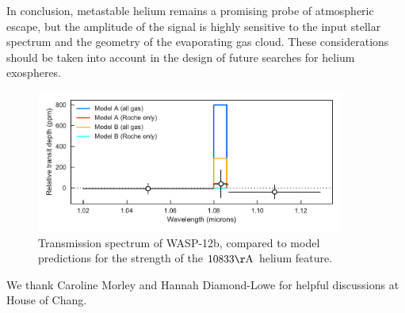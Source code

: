 \documentclass[RNAAS]{aastex62}
\begin{document}
In conclusion, metastable helium remains a promising probe of atmospheric
escape, but the amplitude of the signal is highly sensitive to the input stellar
spectrum and the geometry of
the evaporating gas cloud.  These considerations should be taken into account in the design of future searches for helium exospheres.

 
\begin{figure}
\begin{centering}
\includegraphics[width = 0.9\textwidth]{fig1.pdf}
\caption{Transmission spectrum of WASP-12b, compared to model predictions for
the strength of the $10833\mathrm{\AA}$ helium feature.}
\end{centering}
\label{fig:spectrum}
\end{figure}

\acknowledgements
We thank Caroline Morley and Hannah Diamond-Lowe for helpful discussions at House of Chang.

%
%
\end{document}
